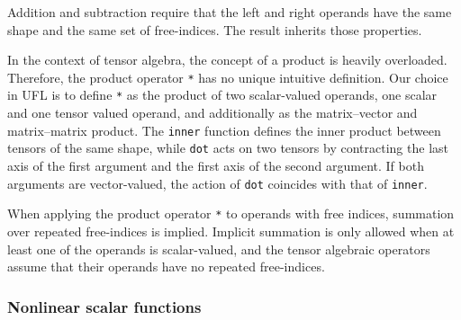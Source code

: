 \documentclass[prodmode,acmtoms]{acmsmall}
\newcommand{\uflc}[1]{\texttt{#1}}
\begin{document}
Addition and subtraction require that the left and right operands have
the same shape and the same set of free-indices. The result inherits
those properties.

In the context of tensor algebra, the concept of a product is heavily
overloaded. Therefore, the product operator \uflc{*} has no unique
intuitive definition. Our choice in UFL is to define \uflc{*} as the
product of two scalar-valued operands, one scalar and one tensor
valued operand, and additionally as the matrix--vector and
matrix--matrix product. The \uflc{inner} function defines the inner
product between tensors of the same shape, while \uflc{dot} acts on
two tensors by contracting the last axis of the first argument and the
first axis of the second argument. If both arguments are
vector-valued, the action of \uflc{dot} coincides with that of
\uflc{inner}.

When applying the product operator \uflc{*} to operands with free indices,
summation over repeated free-indices is implied. Implicit summation
is only allowed when at least one of the operands is scalar-valued,
and the tensor algebraic operators assume that their operands have no
repeated free-indices.

\subsubsection{Nonlinear scalar functions}
\end{document}
